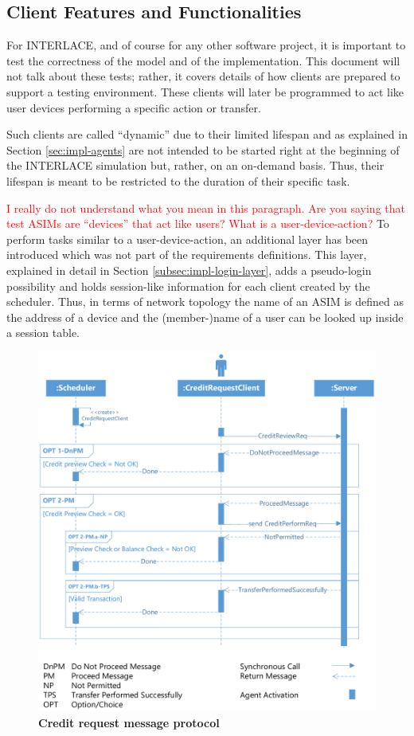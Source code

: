 \subsection{Client Features and Functionalities}
\label{subsec:impl-client-features}

For INTERLACE, and of course for any other software project, it is important to test the correctness of the model and of the implementation. This document will not talk about these tests; rather, it covers details of how clients are prepared to support a testing environment. These clients will later be programmed to act like user devices performing a specific action or transfer.

Such clients are called ``dynamic'' due to their limited lifespan and as explained in Section \ref{sec:impl-agents} are not intended to be started right at the beginning of the INTERLACE simulation but, rather, on an on-demand basis. Thus, their lifespan is meant to be restricted to the duration of their specific task.

\textcolor{red}{I really do not understand what you mean in this paragraph. Are you saying that test ASIMs are ``devices'' that act like users? What is a user-device-action?}
To perform tasks similar to a user-device-action, an additional layer has been introduced which was not part of the requirements definitions. This layer, explained in detail in Section \ref{subsec:impl-login-layer}, adds a pseudo-login possibility and holds session-like information for each client created by the scheduler. Thus, in terms of network topology the name of an ASIM is defined as the address of a device and the (member-)name of a user can be looked up inside a session table.

\begin{figure}[htbp]
  \centering
  \includegraphics[width=1.0\textwidth]{Figures/creditrequest}
  \caption{\bf\small Credit request message protocol}
  \label{fig:impl-msg-crc}
\end{figure}


